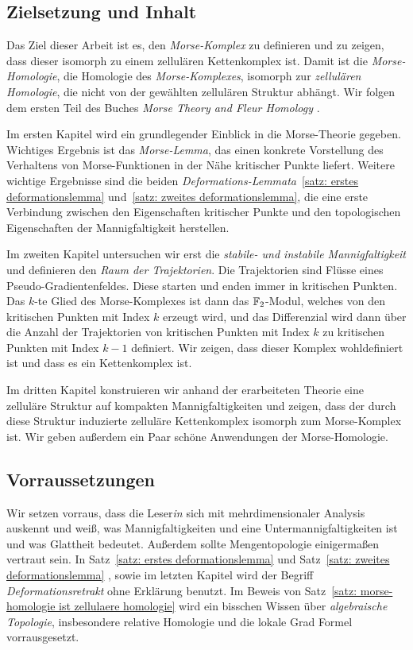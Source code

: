 \documentclass[a4paper,11pt,twoside]{scrreport}
\begin{document}
\subsection*{Zielsetzung und Inhalt}

Das Ziel dieser Arbeit ist es, den \textit{Morse-Komplex} zu definieren und zu zeigen, dass dieser 
isomorph zu einem zellulären Kettenkomplex ist. Damit ist die \textit{Morse-Homologie}, die Homologie des 
\textit{Morse-Komplexes}, isomorph zur \textit{zellulären Homologie}, die nicht von der gewählten 
zellulären Struktur abhängt. Wir folgen dem ersten Teil des Buches 
\textit{Morse Theory and Fleur Homology} \cite{audin}. 

Im ersten Kapitel wird ein grundlegender Einblick in die Morse-Theorie gegeben. Wichtiges Ergebnis ist
das \textit{Morse-Lemma}, das einen konkrete Vorstellung des Verhaltens von Morse-Funktionen in der Nähe 
kritischer Punkte liefert. Weitere wichtige Ergebnisse sind die beiden 
\textit{Deformations-Lemmata}~\ref{satz: erstes deformationslemma} und~\ref{satz: zweites deformationslemma},
die eine erste Verbindung zwischen den Eigenschaften kritischer Punkte und den topologischen Eigenschaften
der Mannigfaltigkeit herstellen.

Im zweiten Kapitel untersuchen wir erst die \textit{stabile- und instabile Mannigfaltigkeit} und 
definieren den \textit{Raum der Trajektorien}. Die Trajektorien sind Flüsse eines Pseudo-Gradien\-ten\-feldes.
Diese starten und enden immer in kritischen Punkten. Das $k$-te Glied des Morse-Komplexes ist dann das
${ \mathbb F }_2$-Modul, welches von den kritischen Punkten mit Index $k$ erzeugt wird, und das Differenzial wird dann 
über die Anzahl der Trajektorien von kritischen Punkten mit Index $k$ zu kritischen Punkten mit Index 
$k - 1$ definiert. Wir zeigen, dass dieser Komplex wohldefiniert ist und dass es ein Kettenkomplex ist. 

Im dritten Kapitel konstruieren wir anhand der erarbeiteten Theorie eine zelluläre Struktur auf kompakten 
Mannigfaltigkeiten und zeigen, dass der durch diese Struktur induzierte zelluläre Kettenkomplex 
isomorph zum Morse-Komplex ist. Wir geben außerdem ein Paar schöne Anwendungen der Morse-Homologie.

\subsection*{Vorraussetzungen}

Wir setzen vorraus, dass die Leser\textit{in} sich mit mehrdimensionaler Analysis auskennt und weiß, was 
Mannigfaltigkeiten und eine Untermannigfaltigkeiten ist und was Glattheit bedeutet. Außerdem sollte 
Mengentopologie einigermaßen vertraut sein. In Satz~\ref{satz: erstes deformationslemma}
und Satz~\ref{satz: zweites deformationslemma} , sowie im letzten Kapitel wird der Begriff
\textit{Deformationsretrakt} ohne Erklärung benutzt. Im Beweis von 
Satz~\ref{satz: morse-homologie ist zellulaere homologie} wird ein bisschen Wissen über 
\textit{algebraische Topologie}, insbesondere relative Homologie und die lokale Grad Formel 
vorrausgesetzt. 
\end{document}

